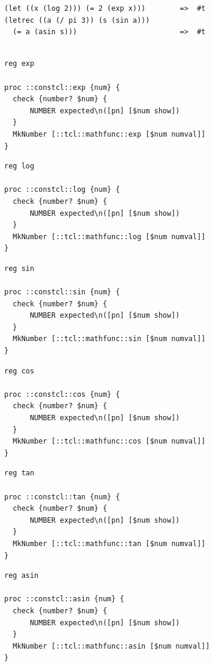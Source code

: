 \documentclass[twoside,9pt]{report}
\begin{document}
\noindent\makebox[\linewidth]{\rule{\linewidth}{0.4pt}}
\begin{lstlisting}
(let ((x (log 2))) (= 2 (exp x)))        =>  #t
(letrec ((a (/ pi 3)) (s (sin a)))
  (= a (asin s)))                        =>  #t
 
\end{lstlisting}
\noindent\makebox[\linewidth]{\rule{\linewidth}{0.4pt}}
\noindent\makebox[\linewidth]{\rule{\linewidth}{0.4pt}}
\begin{lstlisting}
reg exp
 
proc ::constcl::exp {num} {
  check {number? $num} {
      NUMBER expected\n([pn] [$num show])
  }
  MkNumber [::tcl::mathfunc::exp [$num numval]]
}
\end{lstlisting}
\noindent\makebox[\linewidth]{\rule{\linewidth}{0.4pt}}
\noindent\makebox[\linewidth]{\rule{\linewidth}{0.4pt}}
\begin{lstlisting}
reg log
 
proc ::constcl::log {num} {
  check {number? $num} {
      NUMBER expected\n([pn] [$num show])
  }
  MkNumber [::tcl::mathfunc::log [$num numval]]
}
\end{lstlisting}
\noindent\makebox[\linewidth]{\rule{\linewidth}{0.4pt}}
\noindent\makebox[\linewidth]{\rule{\linewidth}{0.4pt}}
\begin{lstlisting}
reg sin
 
proc ::constcl::sin {num} {
  check {number? $num} {
      NUMBER expected\n([pn] [$num show])
  }
  MkNumber [::tcl::mathfunc::sin [$num numval]]
}
\end{lstlisting}
\noindent\makebox[\linewidth]{\rule{\linewidth}{0.4pt}}
\noindent\makebox[\linewidth]{\rule{\linewidth}{0.4pt}}
\begin{lstlisting}
reg cos
 
proc ::constcl::cos {num} {
  check {number? $num} {
      NUMBER expected\n([pn] [$num show])
  }
  MkNumber [::tcl::mathfunc::cos [$num numval]]
}
\end{lstlisting}
\noindent\makebox[\linewidth]{\rule{\linewidth}{0.4pt}}
\noindent\makebox[\linewidth]{\rule{\linewidth}{0.4pt}}
\begin{lstlisting}
reg tan
 
proc ::constcl::tan {num} {
  check {number? $num} {
      NUMBER expected\n([pn] [$num show])
  }
  MkNumber [::tcl::mathfunc::tan [$num numval]]
}
\end{lstlisting}
\noindent\makebox[\linewidth]{\rule{\linewidth}{0.4pt}}
\noindent\makebox[\linewidth]{\rule{\linewidth}{0.4pt}}
\begin{lstlisting}
reg asin
 
proc ::constcl::asin {num} {
  check {number? $num} {
      NUMBER expected\n([pn] [$num show])
  }
  MkNumber [::tcl::mathfunc::asin [$num numval]]
}
\end{lstlisting}
\end{document}
